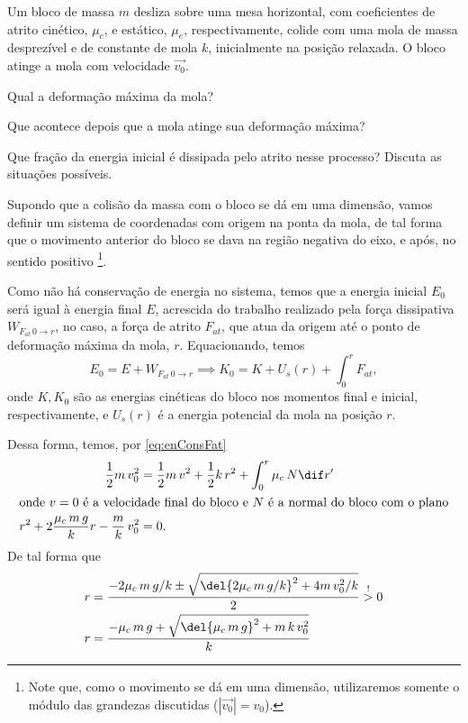 \documentclass[]{IMTexam}
\begin{document}
\begin{questions}
	\question Um bloco de massa $ m $ desliza sobre uma mesa horizontal, com coeficientes de atrito cinético, $ \mu_c $, e estático, $ \mu_e $, respectivamente, colide com uma mola de massa desprezível e de constante de mola $ k $, inicialmente na posição relaxada. O bloco atinge a mola com velocidade $ \vec{v_0} $. \begin{enumerate*}[label=(\alph*)]
		\item Qual a deformação máxima da mola? \item Que acontece depois que a mola atinge sua deformação máxima? \item Que fração da energia inicial é dissipada pelo atrito nesse processo? Discuta as situações possíveis.
	\end{enumerate*}

	\begin{solution}
		\changelabel{(\alph*)}
		\un[start=1]
		Supondo que a colisão da massa com o bloco se dá em uma dimensão, vamos definir um sistema de coordenadas com origem na ponta da mola, de tal forma que o movimento anterior do bloco se dava na região negativa do eixo, e após, no sentido positivo%
		\footnote{Note que, como o movimento se dá em uma dimensão, utilizaremos somente o módulo das grandezas discutidas ($ |\vec{v_0}|=v_0 $).}.

		Como não há conservação de energia no sistema, temos que a energia inicial $ E_0 $ será igual à energia final $ E $, acrescida do trabalho realizado pela força dissipativa $ W_{F_{at}\,0\to r} $, no caso, a força de atrito $ F_{at} $, que atua da origem até o ponto de deformação máxima da mola, $ r $. Equacionando, temos
		\begin{equation}\label{eq:enConsFat}
			E_0=E+W_{F_{at}\,0\to r}\implies K_0=K+U_s(r)+\int_{0}^{r}F_{at},
		\end{equation}
		onde $ K,K_0 $ são as energias cinéticas do bloco nos momentos final e inicial, respectivamente, e $ U_s(r) $ é a energia potencial da mola na posição $ r $.

		Dessa forma, temos, por \ref{eq:enConsFat}
		\begin{align*}
			\dfrac{1}{2}m\,v_0^{2}                               & =\dfrac{1}{2}m\,v^{2}+\dfrac{1}{2}k\,r^{2}+\int_{0}^{r}\mu_c\,N\dif r' \\
			\intertext{onde $ v=0 $ é a velocidade final do bloco e $ N $ é a normal do bloco com o plano}
			r^{2}+2\dfrac{\mu_c\,m\,g}{k}r-\dfrac{m}{k}\,v_0^{2} & =0.
		\end{align*}
		De tal forma que
		\begin{align*}
			r & =\dfrac{-2\mu_c\,m\,g/k\pm\sqrt{\del{2\mu_c\,m\,g/k}^{2}+4m\,v_0^{2}/k}}{2}\stackrel{!}{>}0 \\
			r & =\dfrac{-\mu_c\,m\,g+\sqrt{\del{\mu_c\,m\,g}^{2}+m\,k\,v_0^{2}}}{k}
		\end{align*}


\end{solution}
\end{questions}
\end{document}
